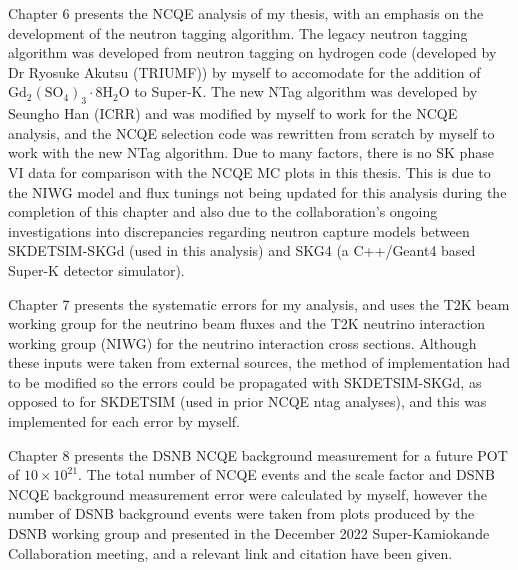 Chapter 6 presents the NCQE analysis of my thesis, with an emphasis on the development of the neutron tagging algorithm. The legacy neutron tagging algorithm was developed from neutron tagging on hydrogen code (developed by Dr Ryosuke Akutsu (TRIUMF)) by myself to accomodate for the addition of $\mathrm{Gd}_{2}\left(\mathrm{SO}_{4}\right)_{3} \cdot 8 \mathrm{H}_{2} \mathrm{O}$ to Super-K. The new NTag algorithm was developed by Seungho Han (ICRR) and was modified by myself to work for the NCQE analysis, and the NCQE selection code was rewritten from scratch by myself to work with the new NTag algorithm. Due to many factors, there is no SK phase VI data for comparison with the NCQE MC plots in this thesis. This is due to the NIWG model and flux tunings not being updated for this analysis during the completion of this chapter and also due to the collaboration's ongoing investigations into discrepancies regarding neutron capture models between SKDETSIM-SKGd (used in this analysis) and SKG4 (a C++/Geant4 based Super-K detector simulator). 

Chapter 7 presents the systematic errors for my analysis, and uses the T2K beam working group for the neutrino beam fluxes and the T2K neutrino interaction working group (NIWG) for the neutrino interaction cross sections. Although these inputs were taken from external sources, the method of implementation had to be modified so the errors could be propagated with SKDETSIM-SKGd, as opposed to for SKDETSIM (used in prior NCQE ntag analyses), and this was implemented for each error by myself. 

Chapter 8 presents the DSNB NCQE background measurement for a future POT of $10 \times 10^{21}$. The total number of NCQE events and the scale factor and DSNB NCQE background measurement error were calculated by myself, however the number of DSNB background events were taken from plots produced by the DSNB working group and presented in the December 2022 Super-Kamiokande Collaboration meeting, and a relevant link and citation have been given. 